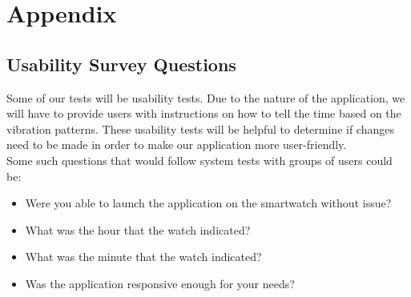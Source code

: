 



\newpage

\section{Appendix}


\subsection{Usability Survey Questions}

Some of our tests will be usability tests. Due to the nature of the application, we will have to provide users with instructions on how to tell the time based on the vibration patterns. These usability tests will be helpful to determine if changes need to be made in order to make our application more user-friendly. \\
Some such questions that would follow system tests with groups of users could be:
\begin{itemize}
\item Were you able to launch the application on the smartwatch without issue?
\item What was the hour that the watch indicated?
\item What was the minute that the watch indicated?
\item Was the application responsive enough for your needs?
\end{itemize}

